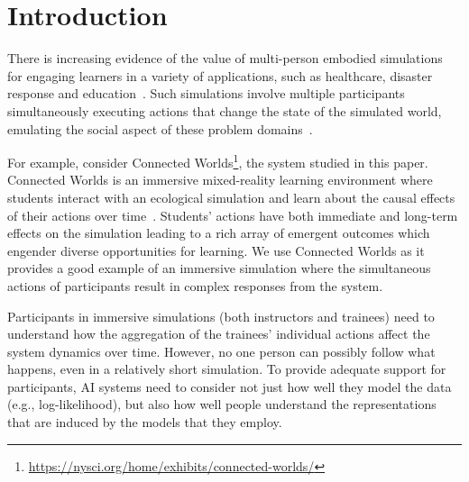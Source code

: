 \documentclass[letterpaper]{article} %
\newcommand{\kibitz}[2]{\ifnum\Comments=1{\textcolor{#1}{#2}}\fi}
\newcommand{\nh}[1]{\kibitz{blue}{[NH:#1]}}
\newcommand{\bjg}[1]{\kibitz{purple}{[BG:#1]}}
\begin{document}


\section{Introduction}
\label{sec:introduction}
There is increasing evidence of the value of multi-person embodied simulations for engaging learners in a variety of 
applications, such as healthcare, disaster response and education~\cite{alinier2014immersive,amir2013plan}. 
Such simulations involve multiple participants simultaneously executing actions that change the state of the simulated world, emulating the social aspect of these problem domains~\cite{smordal2012hybrid}.

For example, consider Connected Worlds\footnote{\url{https://nysci.org/home/exhibits/connected-worlds/}},  the system studied in this paper. Connected Worlds is 
an immersive mixed-reality learning environment 
where students interact with an ecological simulation and learn about the causal effects of their actions over time~\cite{mallavarapu2019connect}. 
Students' actions have both immediate and long-term effects on the simulation leading to a rich array of emergent outcomes which engender diverse opportunities for learning.
We use Connected Worlds as it provides a good example of an immersive simulation where the simultaneous actions of participants result in complex responses from the system.

Participants in immersive simulations (both instructors and trainees) need to understand how the aggregation of the trainees' individual actions affect the system dynamics over time.
However, no one person can possibly follow what happens, even in a relatively short simulation.  
To provide adequate support for participants, AI systems need to consider not just how well they model the data (e.g., log-likelihood), but also how well people understand the representations that are induced by the models that they employ.
\end{document}
